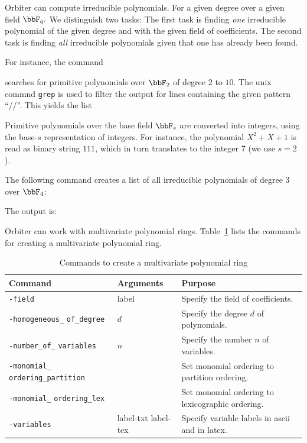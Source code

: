 \bigskip




Orbiter can compute irreducible polynomials.
For a given degree over a given field $\bbF_q.$
We distinguish two tasks: 
The first task is finding {\em one} 
irreducible polynomial of the given degree and with the given field of coefficients.
The second task is finding {\em all} 
irreducible polynomials given that one has already been found.

\bigskip


For instance, the command
{\tt

}
searches for primitive polynomials over $\bbF_2$ of degree $2$ to $10.$ 
The unix commnd \verb'grep' is used to filter the output for 
lines containing the given pattern ``//''. 
This yields the list
\begin{mdframed}[style=MyFrame]

\end{mdframed}
Primitive polynomials over the base field $\bbF_s$ 
are converted into integers, using the base-$s$ representation of integers.
For instance, the polynomial $X^{2} + X + 1$ is read as binary string $111$, 
which in turn translates to the integer $7$ (we use $s=2$).


\bigskip

The following command creates a list of all irreducible polynomials of 
degree $3$ over $\bbF_4$:
{\tt

}
The output is:
\begin{mdframed}[style=MyFrame]

\end{mdframed}


\bigskip




Orbiter can work with multivariate polynomial rings. 
Table~\ref{tab:polynomial:ring} lists the commands 
for creating a multivariate polynomial ring.
\begin{table}
\begin{center}
\begin{tabular}{|p{4cm}|p{3cm}|p{7cm}|}
\hline
Command & Arguments & Purpose \\
\hline
\hline
\verb'-field' & label & Specify the field of coefficients. \\
\hline
\verb'-homogeneous_' \verb'of_degree' & $d$ & Specify the degree $d$ of polynomials. \\
\hline
\verb'-number_of_' \verb'variables' & $n$ & Specify the number $n$ of variables. \\
\hline
\verb'-monomial_' \verb'ordering_partition' &  & Set monomial ordering to partition ordering. \\
\hline
\verb'-monomial_' \verb'ordering_lex' &  & Set monomial ordering to lexicographic ordering. \\
\hline
\verb'-variables' & label-txt label-tex & Specify variable labels in ascii and in latex. \\
\hline
\end{tabular}
\end{center}
\caption{\label{tab:polynomial:ring}Commands to create a multivariate polynomial ring}
\end{table}

